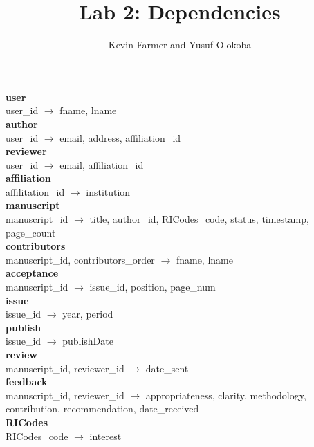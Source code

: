 \documentclass{article}
\title{Lab 2: Dependencies}
\author{Kevin Farmer and Yusuf Olokoba}
\newcommand{\ra}{$\rightarrow$ }
\begin{document}
\maketitle


\textbf{user} \\
user\_id \ra fname, lname \\

\textbf{author} \\
user\_id \ra email, address, affiliation\_id \\

\textbf{reviewer} \\
user\_id \ra email, affiliation\_id \\

\textbf{affiliation} \\
affilitation\_id \ra institution \\

\textbf{manuscript} \\
manuscript\_id \ra title, author\_id, RICodes\_code, status, timestamp, page\_count \\

\textbf{contributors} \\
manuscript\_id, contributors\_order \ra fname, lname \\

\textbf{acceptance} \\
manuscript\_id \ra issue\_id, position, page\_num \\

\textbf{issue} \\
issue\_id \ra year, period \\

\textbf{publish} \\
issue\_id \ra publishDate \\

\textbf{review} \\
manuscript\_id, reviewer\_id \ra date\_sent \\

\textbf{feedback} \\
manuscript\_id, reviewer\_id \ra appropriateness, clarity, methodology, contribution, recommendation, date\_received \\

\textbf{RICodes} \\
RICodes\_code \ra interest \\
\end{document}
